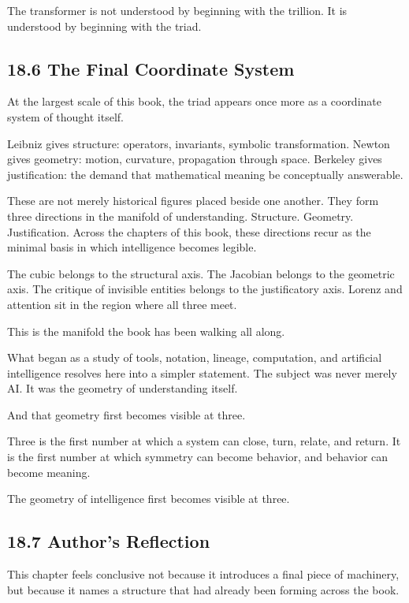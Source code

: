 \documentclass[
]{article}
\begin{document}
The transformer is not understood by beginning with the trillion. It is
understood by beginning with the triad.

\hypertarget{the-final-coordinate-system}{%
\subsection{18.6 The Final Coordinate
System}\label{the-final-coordinate-system}}

At the largest scale of this book, the triad appears once more as a
coordinate system of thought itself.

Leibniz gives structure: operators, invariants, symbolic transformation.
Newton gives geometry: motion, curvature, propagation through space.
Berkeley gives justification: the demand that mathematical meaning be
conceptually answerable.

These are not merely historical figures placed beside one another. They
form three directions in the manifold of understanding. Structure.
Geometry. Justification. Across the chapters of this book, these
directions recur as the minimal basis in which intelligence becomes
legible.

The cubic belongs to the structural axis. The Jacobian belongs to the
geometric axis. The critique of invisible entities belongs to the
justificatory axis. Lorenz and attention sit in the region where all
three meet.

This is the manifold the book has been walking all along.

What began as a study of tools, notation, lineage, computation, and
artificial intelligence resolves here into a simpler statement. The
subject was never merely AI. It was the geometry of understanding
itself.

And that geometry first becomes visible at three.

Three is the first number at which a system can close, turn, relate, and
return. It is the first number at which symmetry can become behavior,
and behavior can become meaning.

The geometry of intelligence first becomes visible at three.

\hypertarget{authors-reflection-1}{%
\subsection{18.7 Author's Reflection}\label{authors-reflection-1}}

This chapter feels conclusive not because it introduces a final piece of
machinery, but because it names a structure that had already been
forming across the book.
\end{document}
